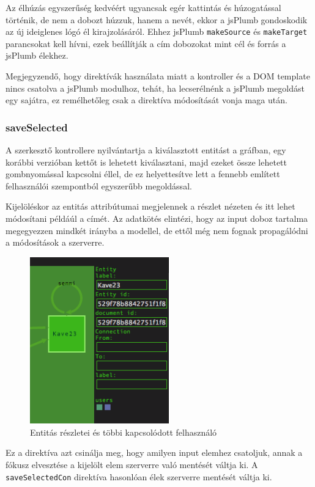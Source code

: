 Az élhúzás egyszerűség kedvéért ugyancsak egér kattintás és húzogatással történik, de nem a dobozt húzzuk, hanem a nevét, ekkor a jsPlumb gondoskodik az új ideiglenes lógó él kirajzolásáról. Ehhez jsPlumb \lstinline{makeSource} és \lstinline{makeTarget} parancsokat kell hívni, ezek beállítják a cím dobozokat mint cél és forrás a jsPlumb élekhez.

Megjegyzendő, hogy direktívák használata miatt a kontroller és a DOM template nincs csatolva a jsPlumb modulhoz, tehát, ha lecserélnénk a jsPlumb megoldást egy sajátra, ez remélhetőleg csak a direktíva módosítását vonja maga után.

\subsubsection{saveSelected}

A szerkesztő kontrollere nyilvántartja a kiválasztott entitást a gráfban, egy korábbi verzióban kettőt is lehetett kiválasztani, majd ezeket össze lehetett gombnyomással kapcsolni éllel, de ez helyettesítve lett a fennebb említett felhasználói szempontból egyszerűbb megoldással. 

Kijelöléskor az entitás attribútumai megjelennek a részlet nézeten és itt lehet módosítani példáúl a címét. Az adatkötés elintézi, hogy az input doboz tartalma megegyezzen mindkét irányba a modellel, de ettől még nem fognak propagálódni a módosítások a szerverre. 

\begin{figure}[!ht]
\centering
\includegraphics[width=6cm,keepaspectratio]{figures/attributes.png}
\caption{Entitás részletei és többi kapcsolódott felhasználó}
\label{fig:entityattr}
\end{figure}

Ez a direktíva azt csinálja meg, hogy amilyen input elemhez csatoljuk, annak a fókusz elvesztése a kijelölt elem szerverre való mentését váltja ki. A \lstinline{saveSelectedCon} direktíva hasonlóan élek szerverre mentését váltja ki.


